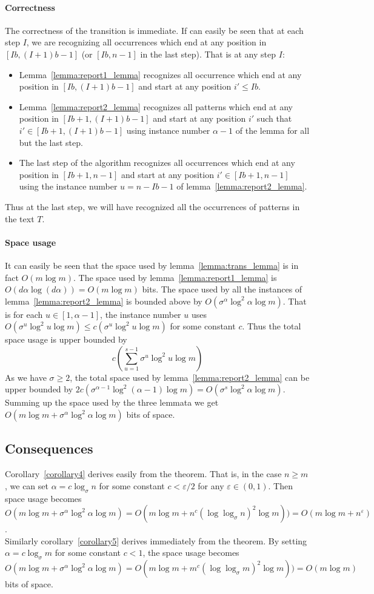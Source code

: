 \documentclass{article}
\newcommand{\?}{\mskip1.5mu}
\renewcommand{\epsilon}{\varepsilon}
\begin{document}
\paragraph{Correctness}
The correctness of the transition is immediate. If can easily be seen that at each step $I$, we are recognizing all occurrences which end at any position in $[Ib,(I+1)b-1]$ (or $[Ib,n-1]$ in the last step). That is at any step $I$:
\begin{itemize}
\item Lemma~\ref{lemma:report1_lemma} recognizes all occurrence which end at any position in $[Ib,(I+1)b-1]$ and start at any position $i'\leq Ib$.
\item Lemma~\ref{lemma:report2_lemma} recognizes all patterns which end at any position in $[Ib+1,(I+1)b-1]$ and start at any position $i'$ such that $i'\in[Ib+1,(I+1)b-1]$ using instance number $\alpha-1$ of the lemma for all but the last step. 
\item The last step of the algorithm recognizes all occurrences which end at any position in $[Ib+1,n-1]$ and start at any position $i'\in[Ib+1,n-1]$ using the instance number $u=n-Ib-1$ of lemma~\ref{lemma:report2_lemma}. 
\end{itemize} 
Thus at the last step, we will have recognized all the occurrences of patterns in the text $T$. 

\paragraph{Space usage}
It can easily be seen that the space used by lemma~\ref{lemma:trans_lemma} is in fact $O(m\log m)$. The space used by lemma~\ref{lemma:report1_lemma} is $O(d\alpha\log (d\alpha))=O(m\log m)$ bits. The space used by all the instances of lemma~\ref{lemma:report2_lemma} is bounded above by $O(\sigma^\alpha\log^2\alpha\log m)$. That is for each $u\in[1,\alpha-1]$, the instance number $u$ uses $O(\sigma^u\log^2 u\log m)\leq c(\sigma^u\log^2 u\log m)$ for some constant $c$. Thus the total space usage is upper bounded by $$c(\sum_{u=1}^{s-1}\sigma^u\log^2 u\log m)$$ 
As we have $\sigma\geq 2$, the total space used by lemma~\ref{lemma:report2_lemma} can be upper bounded by $2c(\sigma^{\alpha-1}\log^2 (\alpha-1)\log m)=O(\sigma^s\log^2 \alpha\log m)$. Summing up the space used by the three lemmata we get $O(m\log m+\sigma^\alpha\log^2\alpha\log m)$ bits of space.

\subsection{Consequences}
Corollary~\ref{corollary4} derives easily from the theorem. That is, in the case $n\geq m$, we can set $\alpha=c\log_\sigma n$ for some constant $c<\epsilon/2$ for any $\epsilon\in(0,1)$. Then space usage becomes $O(m\log m+\sigma^\alpha\log^2 \alpha\log m)=O(m\log m+n^c(\log\log_\sigma n)^2\log m))=O(m\log m+n^{\epsilon})$.
\\
Similarly corollary~\ref{corollary5} derives immediately from the theorem. By setting $\alpha=c\log_\sigma m$ for some constant $c<1$, the space usage becomes $O(m\log m+\sigma^\alpha\log^2 \alpha\log m)=O(m\log m+m^c(\log\log_\sigma m)^2\log m))=O(m\log m)$ bits of space.
\end{document}
